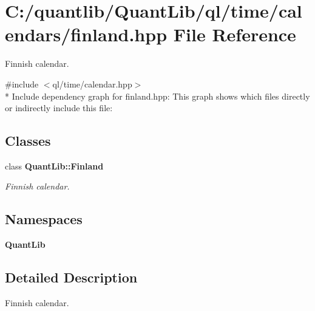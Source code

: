 \section{C\+:/quantlib/\+Quant\+Lib/ql/time/calendars/finland.hpp File Reference}
\label{finland_8hpp}


Finnish calendar.  


{\ttfamily \#include $<$ql/time/calendar.\+hpp$>$}\\*
Include dependency graph for finland.\+hpp\+:
This graph shows which files directly or indirectly include this file\+:
\subsection*{Classes}
\begin{DoxyCompactItemize}
\item 
class {\bf Quant\+Lib\+::\+Finland}
\begin{DoxyCompactList}\small\item\em Finnish calendar. \end{DoxyCompactList}\end{DoxyCompactItemize}
\subsection*{Namespaces}
\begin{DoxyCompactItemize}
\item 
 {\bf Quant\+Lib}
\end{DoxyCompactItemize}


\subsection{Detailed Description}
Finnish calendar. 

